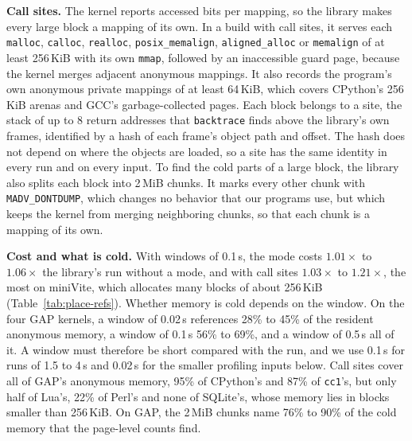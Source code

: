 \documentclass[11pt]{article}
\newcommand{\tabref}[1]{Table~\ref{#1}}
\begin{document}
\textbf{Call sites.} The kernel reports accessed bits per mapping, so the library makes every large block a mapping
of its own. In a build with call sites, it serves each \texttt{malloc}, \texttt{calloc}, \texttt{realloc},
\texttt{posix\_memalign}, \texttt{aligned\_alloc} or \texttt{memalign} of at least 256\,KiB with its own
\texttt{mmap}, followed by an inaccessible guard page, because the kernel merges adjacent anonymous mappings. It also
records the program's own anonymous private mappings of at least 64\,KiB, which covers CPython's 256\,KiB arenas and
GCC's garbage-collected pages. Each block belongs to a site, the stack of up to 8 return addresses that
\texttt{backtrace} finds above the library's own frames, identified by a hash of each frame's object path and offset.
The hash does not depend on where the objects are loaded, so a site has the same identity in every run and on every
input. To find the cold parts of a large block, the library also splits each block into 2\,MiB chunks. It marks every
other chunk with \texttt{MADV\_DONTDUMP}, which changes no behavior that our programs use, but which keeps the kernel
from merging neighboring chunks, so that each chunk is a mapping of its own.

\begin{table}[t]
\centering
\small
\caption{Measuring hot and cold memory: run time with windows of 0.1\,s over the library's run without a mode, for the
zones alone (refs) and with call sites (sites); the share of the resident anonymous memory referenced within a window
at three window lengths (memory-time weighted); the share of anonymous memory in site blocks at the peak (site share);
and the cold bytes at 2\,MiB chunk granularity over the cold bytes at page granularity at the peak, with windows of
0.1\,s (cold named). Median of 3 runs, one run for the windows of 0.02 and 0.5\,s.}
\label{tab:place-refs}
\setlength{\tabcolsep}{4pt}

\end{table}

\textbf{Cost and what is cold.} With windows of 0.1\,s, the mode costs $1.01\times$ to $1.06\times$ the library's run
without a mode, and with call sites $1.03\times$ to $1.21\times$, the most on miniVite, which allocates many blocks
of about 256\,KiB (\tabref{tab:place-refs}). Whether memory is cold depends on the window. On the four GAP kernels, a
window of 0.02\,s references 28\% to 45\% of the resident anonymous memory, a window of 0.1\,s 56\% to 69\%, and a
window of 0.5\,s all of it. A window must therefore be short compared with the run, and we use 0.1\,s for runs of 1.5
to 4\,s and 0.02\,s for the smaller profiling inputs below. Call sites cover all of GAP's anonymous memory, 95\% of
CPython's and 87\% of \texttt{cc1}'s, but only half of Lua's, 22\% of Perl's and none of SQLite's, whose memory lies
in blocks smaller than 256\,KiB. On GAP, the 2\,MiB chunks name 76\% to 90\% of the cold memory that the page-level
counts find.
\end{document}
